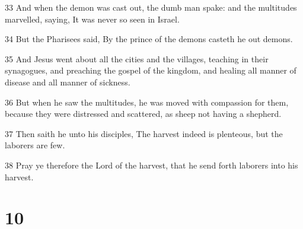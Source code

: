 \par 33 And when the demon was cast out, the dumb man spake: and the multitudes marvelled, saying, It was never so seen in Israel.
\par 34 But the Pharisees said, By the prince of the demons casteth he out demons.
\par 35 And Jesus went about all the cities and the villages, teaching in their synagogues, and preaching the gospel of the kingdom, and healing all manner of disease and all manner of sickness.
\par 36 But when he saw the multitudes, he was moved with compassion for them, because they were distressed and scattered, as sheep not having a shepherd.
\par 37 Then saith he unto his disciples, The harvest indeed is plenteous, but the laborers are few.
\par 38 Pray ye therefore the Lord of the harvest, that he send forth laborers into his harvest.

\chapter{10}

